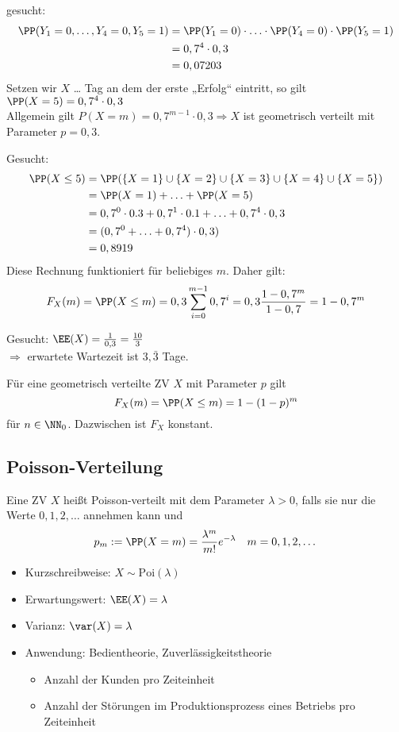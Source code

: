 \begin{anumerate}
\item gesucht: \begin{align*}
\PP(Y_1=0, \ldots, Y_4=0, Y_5=1) &= \PP(Y_1=0) \cdot \ldots \cdot \PP(Y_4=0) \cdot \PP(Y_5=1) \\
&= 0,7 ^4 \cdot 0,3 \\
&= 0,07203
\end{align*}
Setzen wir $X$ … Tag an dem der erste „Erfolg“ eintritt, so gilt $\PP(X=5)=0,7^4\cdot 0,3$\\
Allgemein gilt $P(X=m)=0,7^{m-1}\cdot 0,3 \Rightarrow X$ ist geometrisch verteilt mit Parameter $p=0,3$.
\item Gesucht:
\begin{align*}
\PP(X\leq 5)&=\PP(\{X=1\}\cup \{X=2\} \cup \{X=3\} \cup \{X=4\} \cup \{X=5\}) \\
&= \PP(X=1) + \ldots + \PP(X=5) \\
&= 0,7^0\cdot 0.3 + 0,7^1 \cdot 0.1 + \ldots + 0,7^4 \cdot 0,3 \\
&= (0,7^0+\ldots+0,7^4)\cdot 0,3 ) \\
&= 0,8919
\end{align*}
Diese Rechnung funktioniert für beliebiges $m$. Daher gilt: 
$$F_X(m)=\PP(X\leq m) = 0,3 \sum_{i=0}^{m-1}0,7^i=0,3 \frac{1-0,7^m}{1-0,7}=1-0,7^m$$
\item Gesucht: $\EE(X)=\frac{1}{0,3}=\frac{10}{3}$\\
$\Rightarrow$ erwartete Wartezeit ist $3,\bar{3}$ Tage.
\end{anumerate}

 Für eine geometrisch verteilte ZV $X$ mit Parameter $p$ gilt 
$$F_X(m)=\PP(X\leq m) = 1-(1-p)^m$$
für $n \in \NN_0$. Dazwischen ist $F_X$ konstant.

\subsection{Poisson-Verteilung}
 Eine ZV $X$ heißt Poisson-verteilt mit dem Parameter $\lambda >0$, falls sie nur die Werte $0,1,2,\dots$ annehmen kann und 
$$p_m:=\PP(X=m)=\frac{\lambda^m}{m!}e^{-\lambda} \quad m=0,1,2,\dots$$
\begin{itemize}
\item Kurzschreibweise: $X\sim \mathrm{Poi}(\lambda)$
\item Erwartungswert: $\EE(X)=\lambda$
\item Varianz: $\var(X)=\lambda$
\item Anwendung: Bedientheorie, Zuverlässigkeitstheorie
\begin{itemize}
\item Anzahl der Kunden pro Zeiteinheit
\item Anzahl der Störungen im Produktionsprozess eines Betriebs pro Zeiteinheit
\end{itemize}
\end{itemize}

